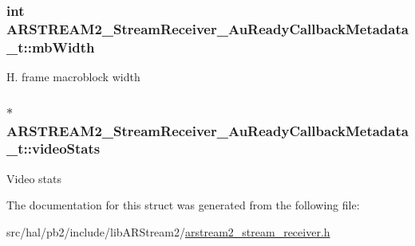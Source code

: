 \subsubsection[{\texorpdfstring{mb\+Width}{mbWidth}}]{\setlength{\rightskip}{0pt plus 5cm}int A\+R\+S\+T\+R\+E\+A\+M2\+\_\+\+Stream\+Receiver\+\_\+\+Au\+Ready\+Callback\+Metadata\+\_\+t\+::mb\+Width}\hypertarget{struct_a_r_s_t_r_e_a_m2___stream_receiver___au_ready_callback_metadata__t_a5095970e24e3cdf0ea809a02cb71fd60}{}\label{struct_a_r_s_t_r_e_a_m2___stream_receiver___au_ready_callback_metadata__t_a5095970e24e3cdf0ea809a02cb71fd60}
H. frame macroblock width 
\subsubsection[{\texorpdfstring{video\+Stats}{videoStats}}]{$\ast$ A\+R\+S\+T\+R\+E\+A\+M2\+\_\+\+Stream\+Receiver\+\_\+\+Au\+Ready\+Callback\+Metadata\+\_\+t\+::video\+Stats}\hypertarget{struct_a_r_s_t_r_e_a_m2___stream_receiver___au_ready_callback_metadata__t_aee133d4eab1751aef189496539027ea1}{}\label{struct_a_r_s_t_r_e_a_m2___stream_receiver___au_ready_callback_metadata__t_aee133d4eab1751aef189496539027ea1}
Video stats 

The documentation for this struct was generated from the following file\+:\begin{DoxyCompactItemize}
\item 
src/hal/pb2/include/lib\+A\+R\+Stream2/\hyperlink{arstream2__stream__receiver_8h}{arstream2\+\_\+stream\+\_\+receiver.\+h}\end{DoxyCompactItemize}
